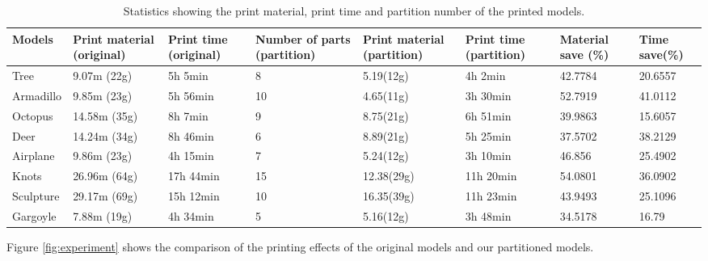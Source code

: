 \begin{table}[htb]

\begin{footnotesize}

\begin{center}

    \begin{tabular}{ p{1cm} p{1.5cm} p{1.5cm} p{1.81cm} p{1.53cm} p{1.5cm} p{1.7cm} p{1.7cm} }

    \hline

     Models& Print material (original)& Print time (original)& Number of parts (partition)& Print material (partition)& Print time (partition)& Material save (\%) &Time save(\%)\\ \hline
     Tree& 9.07m (22g)& 5h 5min & 8 &5.19(12g) & 4h 2min & 42.7784 &20.6557\\ \hline
     Armadillo& 9.85m (23g)& 5h 56min & 10  &4.65(11g) & 3h 30min & 52.7919 &41.0112\\ \hline
     Octopus& 14.58m (35g)& 8h 7min & 9  &8.75(21g) &6h 51min & 39.9863 &15.6057\\ \hline
     Deer& 14.24m (34g)& 8h 46min & 6  &8.89(21g) &5h 25min & 37.5702 &38.2129\\ \hline
     Airplane& 9.86m (23g)& 4h 15min & 7 &5.24(12g) &3h 10min & 46.856 &25.4902\\ \hline
     Knots& 26.96m (64g)& 17h 44min & 15 &12.38(29g) &11h 20min & 54.0801 &36.0902\\ \hline
     Sculpture& 29.17m (69g)& 15h 12min & 10 &16.35(39g) &11h 23min & 43.9493 &25.1096\\ \hline
     Gargoyle& 7.88m (19g)& 4h 34min & 5 &5.16(12g) &3h 48min & 34.5178 &16.79\\ \hline

  \hline

    \end{tabular}

\end{center}

\end{footnotesize}

\caption{Statistics showing the print material, print time and partition number of the printed models.}\label{tab:ertms:summary}

\end{table}



Figure \ref{fig:experiment} shows the comparison of the printing effects of the original models and our partitioned models.

